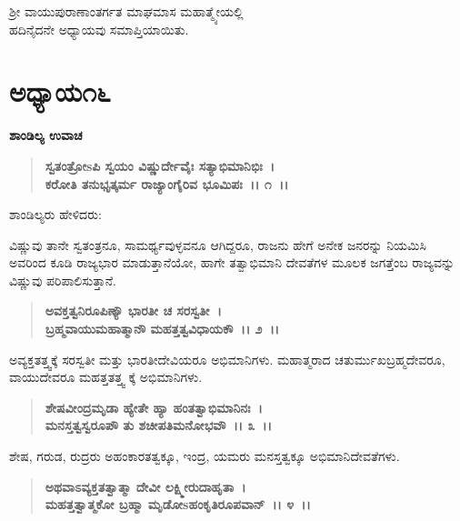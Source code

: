 \begin{center}
ಶ‍್ರೀ ವಾಯುಪುರಾಣಾಂತರ್ಗತ ಮಾಘಮಾಸ ಮಹಾತ್ಮ್ಯೇಯಲ್ಲಿ \\ ಹದಿನೈದನೇ ಅಧ್ಯಾಯವು ಸಮಾಪ್ತಿಯಾಯಿತು.
\end{center}

\newpage

\section*{ಅಧ್ಯಾಯ\enginline{-}೧೬}

\begin{flushleft}
\textbf{ಶಾಂಡಿಲ್ಯ ಉವಾಚ \enginline{-}}
\end{flushleft}

\begin{verse}
\textbf{ಸ್ವತಂತ್ರೋsಪಿ ಸ್ವಯಂ ವಿಷ್ಣುರ್ದೇವೈಃ ಸತ್ಯಾಭಿಮಾನಿಭಿಃ~।}\\\textbf{ಕರೋತಿ ತನುಭೃತ್ಕರ್ಮ ರಾಜ್ಯಾಂಗೈರಿವ ಭೂಮಿಪಃ~।। ೧~।।}
\end{verse}

\begin{flushleft}
ಶಾಂಡಿಲ್ಯರು ಹೇಳಿದರು:
\end{flushleft}

ವಿಷ್ಣುವು ತಾನೇ ಸ್ವತಂತ್ರನೂ, ಸಾಮರ್ಥ್ಯವುಳ್ಳವನೂ ಆಗಿದ್ದರೂ, ರಾಜನು ಹೇಗೆ ಅನೇಕ ಜನರನ್ನು ನಿಯಮಿಸಿ ಅವರಿಂದ ಕೂಡಿ ರಾಜ್ಯಭಾರ ಮಾಡುತ್ತಾನೆಯೋ, ಹಾಗೇ ತತ್ವಾಭಿಮಾನಿ ದೇವತೆಗಳ ಮೂಲಕ ಜಗತ್ತೆಂಬ ರಾಜ್ಯವನ್ನು ವಿಷ್ಣುವು ಪರಿಪಾಲಿಸುತ್ತಾನೆ.

\begin{verse}
\textbf{ಅವಕ್ತತ್ವನಿರೂಪಿಣ್ಯೌ ಭಾರತೀ ಚ ಸರಸ್ವತೀ~।}\\\textbf{ಬ್ರಹ್ಮವಾಯುಮಹಾತ್ಮಾನೌ ಮಹತ್ತತ್ವವಿಧಾಯಕೌ~।। ೨~।।}
\end{verse}

ಅವ್ಯಕ್ತತತ್ತ್ವಕ್ಕೆ ಸರಸ್ವತೀ ಮತ್ತು ಭಾರತೀದೇವಿಯರೂ ಅಭಿಮಾನಿಗಳು. ಮಹಾತ್ಮರಾದ ಚತುರ್ಮುಖಬ್ರಹ್ಮದೇವರೂ, ವಾಯುದೇವರೂ ಮಹತ್ತತತ್ತ್ವ ಕ್ಕೆ ಅಭಿಮಾನಿಗಳು.

\begin{verse}
\textbf{ಶೇಷವೀಂದ್ರಮೃಡಾ ಹ್ಯೇತೇ ಹ್ಯಾ ಹಂತತ್ವಾಭಿಮಾನಿನಃ~।}\\\textbf{ಮನಸ್ತತ್ವಸ್ವರೂಪೌ ತು ಶಚೀಪತಿಮನೋಭವೌ~।। ೩~।।}
\end{verse}

ಶೇಷ, ಗರುಡ, ರುದ್ರರು ಅಹಂಕಾರತತ್ವಕ್ಕೂ, ಇಂದ್ರ, ಯಮರು ಮನಸ್ತತ್ವಕ್ಕೂ ಅಭಿಮಾನಿದೇವತೆಗಳು.

\begin{verse}
\textbf{ಅಥವಾಽವ್ಯಕ್ತತತ್ವಾತ್ಮಾ ದೇವೀ ಲಕ್ಷ್ಮೀರುದಾಹೃತಾ~।}\\\textbf{ಮಹತ್ತತ್ವಾತ್ಮಕೋ ಬ್ರಹ್ಮಾ ಮೃಡೋsಹಂಕೃತಿರೂಪವಾನ್~।। ೪~।।}
\end{verse}

